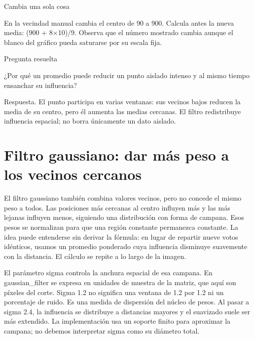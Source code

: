 
\begin{Practica}{Cambia una sola cosa}

En la vecindad manual cambia el centro de 90 a 900. Calcula antes la nueva media: (900 + 8×10)/9. Observa que el número mostrado cambia aunque el blanco del gráfico pueda saturarse por su escala fija.


\end{Practica}


\begin{Idea}{Pregunta resuelta}

¿Por qué un promedio puede reducir un punto aislado intenso y al mismo tiempo ensanchar su influencia?


Respuesta. El punto participa en varias ventanas: sus vecinos bajos reducen la media de su centro, pero él aumenta las medias cercanas. El filtro redistribuye influencia espacial; no borra únicamente un dato aislado.


\end{Idea}

\clearpage

\section{Filtro gaussiano: dar más peso a los vecinos cercanos}


El filtro gaussiano también combina valores vecinos, pero no concede el mismo peso a todos. Las posiciones más cercanas al centro influyen más y las más lejanas influyen menos, siguiendo una distribución con forma de campana. Esos pesos se normalizan para que una región constante permanezca constante. La idea puede entenderse sin derivar la fórmula: en lugar de repartir nueve votos idénticos, usamos un promedio ponderado cuya influencia disminuye suavemente con la distancia. El cálculo se repite a lo largo de la imagen.


El parámetro sigma controla la anchura espacial de esa campana. En gaussian\_filter se expresa en unidades de muestra de la matriz, que aquí son píxeles del corte. Sigma 1.2 no significa una ventana de 1.2 por 1.2 ni un porcentaje de ruido. Es una medida de dispersión del núcleo de pesos. Al pasar a sigma 2.4, la influencia se distribuye a distancias mayores y el suavizado suele ser más extendido. La implementación usa un soporte finito para aproximar la campana; no debemos interpretar sigma como su diámetro total.


